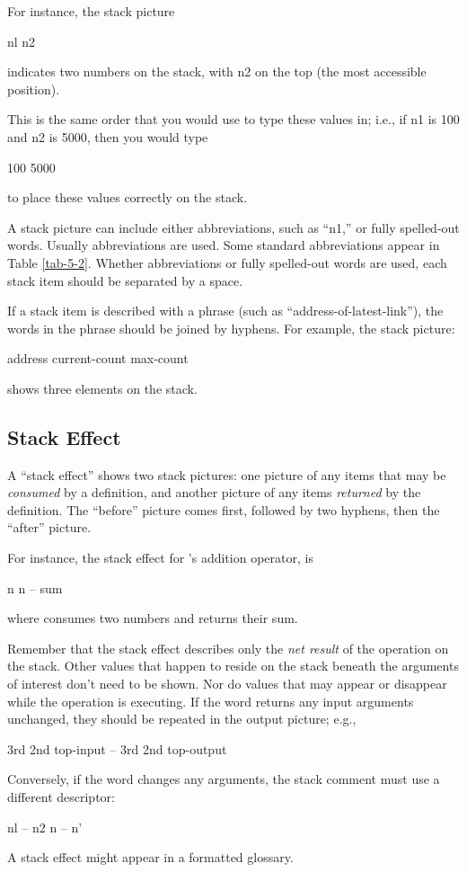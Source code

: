 For instance, the stack picture
\begin{Code}
nl n2
\end{Code}
indicates two numbers on the stack, with n2 on the top (the most
accessible position).

This is the same order that you would use to type these values in;
i.e., if n1 is 100 and n2 is 5000, then you would type
\begin{Code}
100 5000
\end{Code}
to place these values correctly on the stack.

A stack picture can include either abbreviations, such as ``n1,'' or
fully spelled-out words.  Usually abbreviations are used.  Some
standard abbreviations appear in Table \ref{tab-5-2}.  Whether
abbreviations or fully spelled-out words are used, each stack item
should be separated by a space.

If a stack item is described with a phrase (such as
``address-of-latest-link''), the words in the phrase should be joined
by hyphens.  For example, the stack picture:
\begin{Code}
address current-count max-count
\end{Code}
shows three elements on the stack.

\subsection{Stack Effect}

A ``stack effect'' shows two stack pictures: one picture of any items
that may be \emph{consumed} by a definition, and another picture of
any items \emph{returned} by the definition.  The ``before'' picture
comes first, followed by two hyphens, then the ``after'' picture.

For instance, the stack effect for \Forth{}'s addition operator,
\forth{+} is
\begin{Code}
n n -- sum
\end{Code}
where \forth{+} consumes two numbers and returns their sum.

Remember that the stack effect describes only the \emph{net result} of
the operation on the stack.  Other values that happen to reside on the
stack beneath the arguments of interest don't need to be shown.  Nor
do values that may appear or disappear while the operation is
executing.  If the word returns any input arguments unchanged, they
should be repeated in the output picture; e.g.,
\begin{Code}
3rd 2nd top-input -- 3rd 2nd top-output
\end{Code}
Conversely, if the word changes any arguments, the stack comment must
use a different descriptor:
\begin{Code}
nl -- n2
n -- n'
\end{Code}
A stack effect might appear in a formatted glossary.

